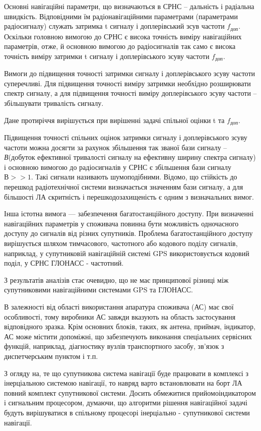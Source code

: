 Основні навігаційні параметри, що визначаються в СРНС -- дальність і радіальна швидкість. Відповідними 
їм радіонавігаційними параметрами (параметрами радіосигналу) служать затримка t сигналу і доплерівський 
зсув частоти $f_\text{доп}$. Оскільки головною вимогою до СРНС є висока точність виміру 
навігаційних параметрів, отже, й основною вимогою до радіосигналів так само є висока точність 
виміру затримки t сигналу і доплерівського зсуву частоти $f_\text{доп}$.

Вимоги до підвищення точності затримки сигналу і доплерівського зсуву частоти суперечливі. 
Для підвищення точності виміру затримки необхідно розширювати спектр сигналу, а для підвищення 
точності виміру  доплерівського зсуву частоти --  збільшувати тривалість сигналу.

Дане протиріччя вирішується при вирішенні задачі спільної оцінки t та  $f_\text{доп}$.

Підвищення точності спільних оцінок затримки сигналу і доплерівського зсуву частоти можна 
досягти за рахунок збільшення так званої  бази сигналу -- \textit{В}(добуток ефективної 
тривалості сигналу на ефективну ширину спектра сигналу) і основною вимогою до радіосигналів у 
СРНС є збільшення бази сигналу $В>>1$. Такі сигнали називають шумоподібними. 
Відомо, що стійкість до перешкод радіотехнічної системи визначається значенням бази сигналу, 
а для більшості ЛА скритність і перешкодозахищеність є одним з визначальних вимог. 

Інша істотна вимога --- забезпечення багатостанційного доступу. При визначенні навігаційних 
параметрів у споживача повинна бути можливість одночасного доступу до сигналів від різних 
супутників. Проблема багатостанційного доступу вирішується шляхом тимчасового, частотного 
або кодового поділу сигналів, наприклад, у супутниковій навігаційній системі GPS використовується 
кодовий поділ, у СРНС ГЛОНАСС - частотний.

З результатів аналізів стає очевидно, що не має принципової різниці між супутниковими 
навігаційними системами GPS та ГЛОНАСС.

В залежності від області використання апаратура споживача (АС) має свої особливості, 
тому виробники АС завжди вказують на область застосування відповідного зразка. Крім 
основних блоків, таких, як антена, приймач, індикатор, АС може містити допоміжні, що 
забезпечують виконання спеціальних сервісних функцій, наприклад, діагностику вузлів 
транспортного засобу, зв'язок з диспетчерським пунктом і т.п.

З огляду на, те що  супутникова система навігації буде працювати в комплексі з 
інерціальною системою навігації, то навряд варто встановлювати  на борт ЛА повний 
комплект супутникової системи. Досить обмежитися  прийомоіндикатором і сигнальним 
процесором, думаючи, що алгоритми рішення навігаційної задачі будуть вирішуватися 
в спільному процесорі інерціально - супутникової системи навігації. 

